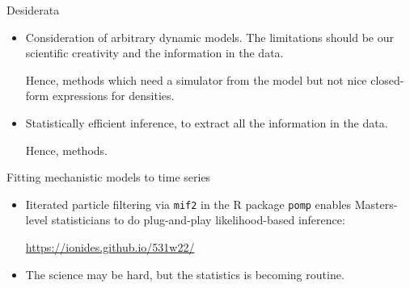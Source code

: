 \documentclass{beamer}
\begin{document}
\begin{frame}{Desiderata}

  \begin{itemize}
    \item Consideration of arbitrary dynamic models. The limitations should be our scientific creativity and the information in the data.

      \vspace{2mm}
      
     Hence,  methods which need a simulator from the model but not nice closed-form expressions for densities.

     \vspace{2mm}
     
    \item Statistically efficient inference, to extract all the information in the data.

      \vspace{2mm}
      
    Hence,  methods.

      \end{itemize}
  \end{frame}

\begin{frame}{Fitting mechanistic models to time series}
  
    \vspace{8mm}

    \begin{itemize}
    \item  Iiterated particle filtering via \texttt{mif2} in the R package \texttt{pomp} enables Masters-level statisticians to do plug-and-play likelihood-based inference:

      \vspace{2mm}

      \url{https://ionides.github.io/531w22/}

      \vspace{5mm}
      \item
      The science may be hard, but the statistics is becoming routine.


    \end{itemize}
\end{frame}
\end{document}
